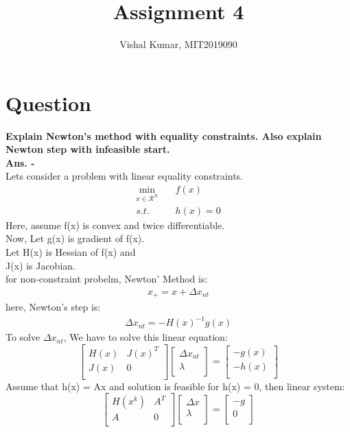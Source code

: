 \documentclass[fleqn]{article}
\title{Assignment 4}
\author{Vishal Kumar, MIT2019090}
\date{}
\begin{document}
\maketitle
\section*{Question}
{\bf Explain Newton’s method with equality constraints. Also explain Newton step with infeasible start.}
\\
{\bf Ans. -}
\\
Lets consider a problem with linear equality constraints.
\begin{align*}
\min_{x \in \mathcal{R}^N}\quad& f(x)\\
s.t. \quad& h(x) = 0
\end{align*}
Here, assume f(x) is convex and twice differentiable.
\\
Now, Let g(x) is gradient of f(x).
\\
Let H(x) is Hessian of f(x) and
\\
J(x) is Jacobian.
\\
for non-constraint probelm, Newton' Method is:
\begin{align*}
    x_+ = x + \Delta x_{nt}
\end{align*}
here, Newton's step is:
\begin{align*}
    \Delta x_{nt} = - H(x)^{-1} g(x)
\end{align*}
To solve $\Delta x_{nt}$, We have to solve this linear equation:
\[
\begin{bmatrix}
    H(x)       & J(x)^T \\
    J(x)       & 0 \\
\end{bmatrix}
\begin{bmatrix}
    \Delta x_{nt}        \\
    \lambda       \\
\end{bmatrix}
=
\begin{bmatrix}
    -g(x)\\
    -h(x)\\
\end{bmatrix}
\]
Assume that h(x) = Ax and solution is feasible for h(x) = 0, then linear system:
\[
\begin{bmatrix}
    H(x^k)       & A^T \\
    A       & 0 \\
\end{bmatrix}
\begin{bmatrix}
    \Delta x        \\
    \lambda       \\
\end{bmatrix}
=
\begin{bmatrix}
    -g\\
    0\\
\end{bmatrix}
\]
\end{document}
